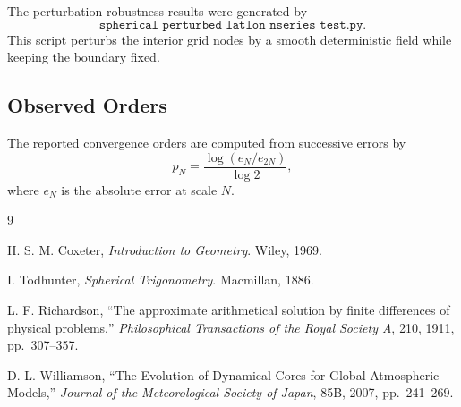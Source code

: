\documentclass[11pt]{article}
\begin{document}
The perturbation robustness results were generated by
\[
  \texttt{spherical\_perturbed\_latlon\_nseries\_test.py}.
\]
This script perturbs the interior grid nodes by a smooth deterministic field while keeping the boundary fixed.

\subsection{Observed Orders}

The reported convergence orders are computed from successive errors by
\[
  p_N
  =
  \frac{\log(e_N/e_{2N})}{\log 2},
\]
where $e_N$ is the absolute error at scale $N$.

\begin{thebibliography}{9}

H. S. M. Coxeter,
\emph{Introduction to Geometry}.
Wiley, 1969.

I. Todhunter,
\emph{Spherical Trigonometry}.
Macmillan, 1886.

L. F. Richardson,
``The approximate arithmetical solution by finite differences of physical
problems,''
\emph{Philosophical Transactions of the Royal Society A}, 210, 1911,
pp.\ 307--357.

D. L. Williamson,
``The Evolution of Dynamical Cores for Global Atmospheric Models,''
\emph{Journal of the Meteorological Society of Japan}, 85B, 2007,
pp.\ 241--269.

\end{thebibliography}
\end{document}
